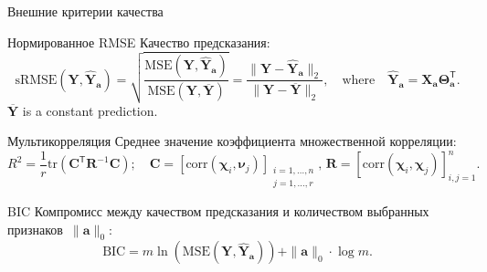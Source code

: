\documentclass[9pt]{beamer}
\newcommand{\ba}{\mathbf{a}}
\newcommand{\bY}{\mathbf{Y}}
\newcommand{\bX}{\mathbf{X}}
\newcommand{\bC}{\mathbf{C}}
\newcommand{\bchi}{\boldsymbol{\chi}}
\newcommand{\bnu}{\boldsymbol{\nu}}
\newcommand{\bTheta}{\boldsymbol{\Theta}}
\newcommand{\T}{\mathsf{T}}
\begin{document}
\begin{frame}{Внешние критерии качества}

\begin{block}{Нормированное RMSE}
	Качество предсказания:
	\[
	\text{sRMSE}(\bY, \widehat{\bY}_{\ba}) = \sqrt{\frac{\text{MSE} (\bY, \widehat{\bY}_{\ba})}{\text{MSE} (\bY, \overline{\bY})}} =  \frac{\| \bY - \widehat{\bY}_{\ba} \|_2}{\| \bY - \overline{\bY} \|_2}, \quad \text{where} \quad \widehat{\bY}_{\ba} = \bX_{\ba} \bTheta_{\ba}^{\T}.
	\]
	$\overline{\bY}$ is a constant prediction.
\end{block}

\begin{block}{Мультикорреляция}
	Среднее значение коэффициента множественной корреляции:
	\[
	R^2 = \frac{1}{r} \text{tr} \left( \bC^{\T} \mathbf{R}^{-1} \bC \right); \quad \bC = [ \text{corr}(\bchi_i, \bnu_j)]_{\substack{i=1, \dots, n \\ j=1, \dots, r}}, \, \mathbf{R} = [ \text{corr}(\bchi_i, \bchi_j)]_{i, j = 1}^n.
	\]
\end{block}
\begin{block}{BIC}
	Компромисс между качеством предсказания и количеством выбранных признаков~$\|\ba\|_0$:
	\[
	\text{BIC} = m \ln \left( \text{MSE} ( \bY, \widehat{\bY}_{\ba})\right) + \| \ba \|_0 \cdot \log m.
	\]
\end{block}
\end{frame}
\end{document}
